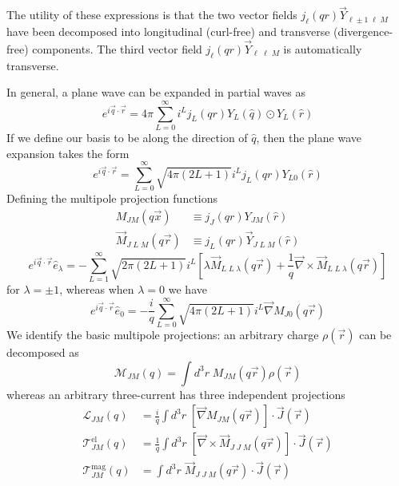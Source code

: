 \documentclass{book}[letterpaper,12pt]
\begin{document}
The utility of these expressions is that the two vector fields $j_\ell(qr)\vec{Y}_{\ell\pm 1\;\ell\;M}$ have been decomposed into longitudinal (curl-free) and transverse (divergence-free) components. The third vector field $j_{\ell}(qr)\vec{Y}_{\ell\;\ell\;M}$ is automatically transverse.

In general, a plane wave can be expanded in partial waves as
\begin{equation}
e^{i\vec{q}\cdot\vec{r}}=4\pi \sum_{L=0}^{\infty}i^Lj_L(qr)Y_L(\hat{q})\odot Y_L(\hat{r})
\end{equation}
If we define our basis to be along the direction of $\hat{q}$, then the plane wave expansion takes the form
\begin{equation}
e^{i\vec{q}\cdot\vec{r}}=\sum_{L=0}^{\infty}\sqrt{4\pi(2L+1)}i^Lj_L(qr)Y_{L0}(\hat{r})
\end{equation}
Defining the multipole projection functions
\begin{equation}
\begin{split}
M_{JM}(q\vec{x})&\equiv j_J(qr)Y_{JM}(\hat{r})\\
\vec{M}_{J\;L\;M}(q\vec{r})&\equiv j_L(qr)\vec{Y}_{J\;L\;M}(\hat{r})
\end{split}
\end{equation}
\begin{equation}
e^{i\vec{q}\cdot\vec{r}}\hat{e}_{\lambda}=-\sum_{L=1}^{\infty}\sqrt{2\pi(2L+1)}i^L\left[\lambda \vec{M}_{L\;L\;\lambda}(q\vec{r})+\frac{1}{q}\vec{\nabla}\times\vec{M}_{L\;L\;\lambda}(q\vec{r})\right]
\end{equation}
for $\lambda = \pm 1$, whereas when $\lambda = 0$ we have
\begin{equation}
e^{i\vec{q}\cdot\vec{r}}\hat{e}_0=-\frac{i}{q}\sum_{L=0}^{\infty}\sqrt{4\pi(2L+1)}i^L\vec{\nabla}M_{J0}(q\vec{r})
\end{equation}
We identify the basic multipole projections: an arbitrary charge $\rho(\vec{r})$ can be decomposed as
\begin{equation}
\mathcal{M}_{JM}(q)=\int d^3r\;M_{JM}(q\vec{r})\rho(\vec{r})
\end{equation}
whereas an arbitrary three-current has three independent projections 
\begin{equation}
\begin{split}
\mathcal{L}_{JM}(q)&=\frac{i}{q}\int d^3r\;\left[\vec{\nabla}M_{JM}(q\vec{r})\right]\cdot\vec{J}(\vec{r})\\
\mathcal{T}^\mathrm{el}_{JM}(q)&=\frac{1}{q}\int d^3r\;\left[\vec{\nabla}\times\vec{M}_{J\;J\;M}(q\vec{r})\right]\cdot\vec{J}(\vec{r})\\
\mathcal{T}^\mathrm{mag}_{JM}(q)&=\int d^3r\;\vec{M}_{J\;J\;M}(q\vec{r})\cdot\vec{J}(\vec{r})
\end{split}
\end{equation}
\end{document}
